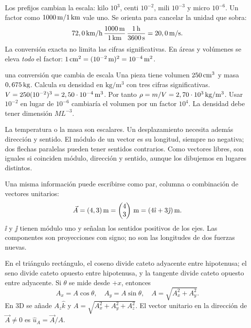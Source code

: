 \documentclass[11pt,a4paper]{article}
\begin{document}
Los prefijos cambian la escala: kilo $10^3$, centi $10^{-2}$, mili $10^{-3}$ y
micro $10^{-6}$. Un factor como $1000\,\mathrm{m}/1\,\mathrm{km}$ vale uno.
Se orienta para cancelar la unidad que sobra:
\[
72,0\,\mathrm{km/h}\,
\frac{1000\,\mathrm{m}}{1\,\mathrm{km}}\,
\frac{1\,\mathrm{h}}{3600\,\mathrm{s}}=20,0\,\mathrm{m/s}.
\]
La conversi\'on exacta no limita las cifras significativas. En \'areas y vol\'umenes
se eleva \emph{todo} el factor: $1\,\mathrm{cm^2}=(10^{-2}\,\mathrm{m})^2=10^{-4}\,\mathrm{m^2}$.

\begin{exercisebox}{una conversi\'on que cambia de escala}
Una pieza tiene volumen $250\,\mathrm{cm^3}$ y masa $0,675\,\mathrm{kg}$.
Calcula su densidad en $\mathrm{kg/m^3}$ con tres cifras significativas.
\solutionblock
$V=250(10^{-2})^3=2,50\cdot10^{-4}\,\mathrm{m^3}$.
Por tanto $\rho=m/V=2,70\cdot10^3\,\mathrm{kg/m^3}$.
Usar $10^{-2}$ en lugar de $10^{-6}$ cambiar\'ia el volumen por un factor $10^4$.
La densidad debe tener dimensi\'on $ML^{-3}$.
\end{exercisebox}

La temperatura o la masa son escalares. Un desplazamiento necesita adem\'as
direcci\'on y sentido. El m\'odulo de un vector es su longitud, siempre no negativa;
dos flechas paralelas pueden tener sentidos contrarios.
Como vectores libres, son iguales si coinciden m\'odulo, direcci\'on y sentido,
aunque los dibujemos en lugares distintos.

Una misma informaci\'on puede escribirse como par, columna o combinaci\'on de
vectores unitarios:
\[
\vec A=(4,3)\,\mathrm{m}
=\begin{pmatrix}4\\3\end{pmatrix}\,\mathrm{m}
=(4\hat{\imath}+3\hat{\jmath})\,\mathrm{m}.
\]
$\ii$ y $\jj$ tienen m\'odulo uno y se\~nalan los sentidos positivos de los ejes.
Las componentes son proyecciones con signo; no son las longitudes de dos fuerzas nuevas.
\begin{center}
\end{center}
En el tri\'angulo rect\'angulo, el coseno divide cateto adyacente entre hipotenusa;
el seno divide cateto opuesto entre hipotenusa, y la tangente divide
cateto opuesto entre adyacente.
Si $\theta$ se mide desde $+x$, entonces
\[
A_x=A\cos\theta,\quad A_y=A\sin\theta,\quad
A=\sqrt{A_x^2+A_y^2}.
\]
En 3D se a\~nade $A_z\hat k$ y $A=\sqrt{A_x^2+A_y^2+A_z^2}$.
El vector unitario en la direcci\'on de $\vec A\ne0$ es $\hat u_A=\vec A/A$.
\end{document}
